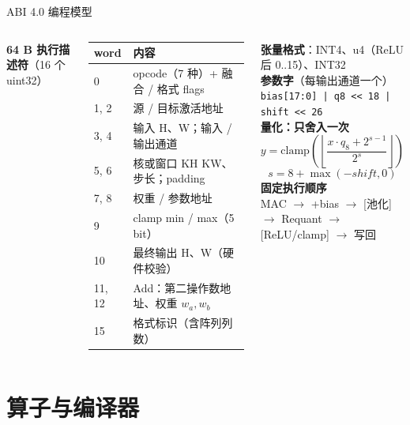 \documentclass[10pt,aspectratio=169,hyperref={colorlinks,urlcolor=peking_blue,linkcolor=}]{beamer}
\def\secHL{}
\begin{document}
\begin{frame}{ABI 4.0 编程模型}
  \begin{columns}[T]
    \textbf{64 B 执行描述符}（16 个 uint32）\\[3pt]
    {\scriptsize
    \begin{tabular}{@{}l l@{}}
      \toprule
      word & 内容 \\ \midrule
      0 & opcode（7 种）+ 融合 / 格式 flags \\
      1, 2 & 源 / 目标激活地址 \\
      3, 4 & 输入 H、W；输入 / 输出通道 \\
      5, 6 & 核或窗口 KH KW、步长；padding \\
      7, 8 & 权重 / 参数地址 \\
      9 & clamp min / max（5 bit） \\
      10 & 最终输出 H、W（硬件校验） \\
      11, 12 & Add：第二操作数地址、权重 $w_a, w_b$ \\
      15 & 格式标识（含阵列列数） \\ \bottomrule
    \end{tabular}}
    \textbf{张量格式}：INT4、u4（ReLU 后 0..15）、INT32\\[6pt]
    \textbf{参数字}（每输出通道一个）\\
    {\small\texttt{bias[17:0] | q8 << 18 | shift << 26}}\\[6pt]
    \textbf{量化：只舍入一次}
    {\small\[ y=\mathrm{clamp}\!\left(\left\lfloor \frac{x\cdot q_8 + 2^{s-1}}{2^{s}} \right\rfloor\right) \]
    \vspace{-8pt}\[ s=8+\max(-\mathit{shift},0) \]}
    \textbf{固定执行顺序}\\[2pt]
    {\small MAC $\rightarrow$ +bias $\rightarrow$ [池化] $\rightarrow$ Requant $\rightarrow$ [ReLU/clamp] $\rightarrow$ 写回}
  \end{columns}
\end{frame}

\def\secHL{array,element,post,requant}
\section{算子与编译器}
\end{document}
